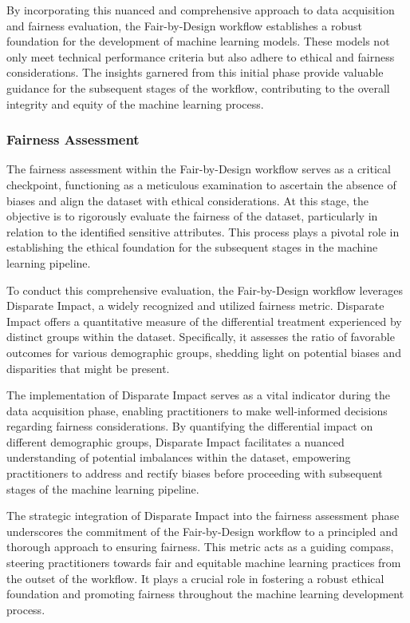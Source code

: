 By incorporating this nuanced and comprehensive approach to data acquisition and fairness evaluation, the Fair-by-Design workflow establishes a robust foundation for the development of machine learning models. These models not only meet technical performance criteria but also adhere to ethical and fairness considerations. The insights garnered from this initial phase provide valuable guidance for the subsequent stages of the workflow, contributing to the overall integrity and equity of the machine learning process.

\subsubsection{Fairness Assessment}

The fairness assessment within the Fair-by-Design workflow serves as a critical checkpoint, functioning as a meticulous examination to ascertain the absence of biases and align the dataset with ethical considerations. At this stage, the objective is to rigorously evaluate the fairness of the dataset, particularly in relation to the identified sensitive attributes. This process plays a pivotal role in establishing the ethical foundation for the subsequent stages in the machine learning pipeline.

To conduct this comprehensive evaluation, the Fair-by-Design workflow leverages Disparate Impact, a widely recognized and utilized fairness metric. Disparate Impact offers a quantitative measure of the differential treatment experienced by distinct groups within the dataset. Specifically, it assesses the ratio of favorable outcomes for various demographic groups, shedding light on potential biases and disparities that might be present.

The implementation of Disparate Impact serves as a vital indicator during the data acquisition phase, enabling practitioners to make well-informed decisions regarding fairness considerations. By quantifying the differential impact on different demographic groups, Disparate Impact facilitates a nuanced understanding of potential imbalances within the dataset, empowering practitioners to address and rectify biases before proceeding with subsequent stages of the machine learning pipeline.

The strategic integration of Disparate Impact into the fairness assessment phase underscores the commitment of the Fair-by-Design workflow to a principled and thorough approach to ensuring fairness. This metric acts as a guiding compass, steering practitioners towards fair and equitable machine learning practices from the outset of the workflow. It plays a crucial role in fostering a robust ethical foundation and promoting fairness throughout the machine learning development process.

